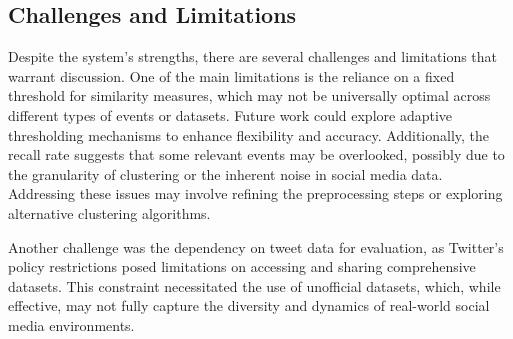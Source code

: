 \subsection{Challenges and Limitations}
Despite the system’s strengths, there are several challenges and limitations that warrant discussion. One of the main limitations is the reliance on a fixed threshold for similarity measures, which may not be universally optimal across different types of events or datasets. Future work could explore adaptive thresholding mechanisms to enhance flexibility and accuracy. Additionally, the recall rate suggests that some relevant events may be overlooked, possibly due to the granularity of clustering or the inherent noise in social media data. Addressing these issues may involve refining the preprocessing steps or exploring alternative clustering algorithms.

Another challenge was the dependency on tweet data for evaluation, as Twitter’s policy restrictions posed limitations on accessing and sharing comprehensive datasets. This constraint necessitated the use of unofficial datasets, which, while effective, may not fully capture the diversity and dynamics of real-world social media environments.

